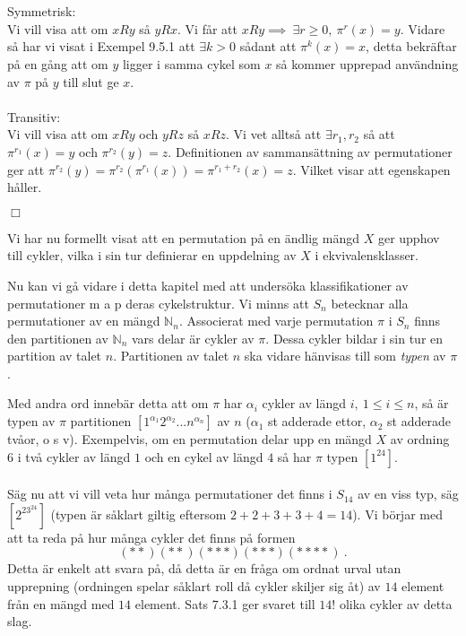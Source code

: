 \documentclass{article}
\begin{document}
\\ \\
Symmetrisk:
\\
Vi vill visa att om $xRy$ så $yRx$. Vi får att $xRy\implies \ \exists r\geq0, \ \pi^r(x)=y.$ Vidare så har vi visat i Exempel 9.5.1 att $\exists k>0$ sådant att $\pi^k(x)=x$, detta bekräftar på en gång att om $y$ ligger i samma cykel som $x$ så kommer upprepad användning av $\pi$ på $y$ till slut ge $x$.
\\ \\
Transitiv:
\\
Vi vill visa att om $xRy$ och $yRz$ så $xRz$. Vi vet alltså att $\exists r_1,r_2$ så att $\pi^{r_1}(x)=y$ och $\pi^{r_2}(y)=z.$ Definitionen av sammansättning av permutationer ger att $\pi^{r_2}(y)=\pi^{r_2}(\pi^{r_1}(x))=\pi^{r_1+r_2}(x)=z.$ Vilket visar att egenskapen håller.
\begin{flushright}
$\Box$
\end{flushright}
Vi har nu formellt visat att en permutation på en ändlig mängd $X$ ger upphov till cykler, vilka i sin tur definierar en uppdelning av $X$ i ekvivalensklasser.

Nu kan vi gå vidare i detta kapitel med att undersöka klassifikationer av permutationer m a p deras cykelstruktur. Vi minns att $S_n$ betecknar alla permutationer av en mängd $\mathbb{N}_n$. Associerat med varje permutation $\pi$ i $S_n$ finns den partitionen av $\mathbb{N}_n$ vars delar är cykler av $\pi$. Dessa cykler bildar i sin tur en partition av talet $n$. Partitionen av talet $n$ ska vidare hänvisas till som \textit{typen} av $\pi$.

Med andra ord innebär detta att om $\pi$ har $\alpha_i$ cykler av längd $i, \ 1\leq i\leq n$, så är typen av $\pi$ partitionen $[1^{\alpha_1}2^{\alpha_2}...n^{\alpha_n}]$ av $n$ ($\alpha_1$ st adderade ettor, $\alpha_2$ st adderade tvåor, o s v). Exempelvis, om en permutation delar upp en mängd $X$ av ordning $6$ i två cykler av längd $1$ och en cykel av längd $4$ så har $\pi$ typen $[1^24]$.
\\ \\
Säg nu att vi vill veta hur många permutationer det finns i $S_{14}$ av en viss typ, säg $[2^23^24]$ (typen är såklart giltig eftersom $2+2+3+3+4=14$). Vi börjar med att ta reda på hur många cykler det finns på formen
$$
(**)(**)(***)(***)(****) \ .
$$
Detta är enkelt att svara på, då detta är en fråga om ordnat urval utan upprepning (ordningen spelar såklart roll då cykler skiljer sig åt) av $14$ element från en mängd med $14$ element. Sats 7.3.1 ger svaret till $14!$ olika cykler av detta slag.
\end{document}
